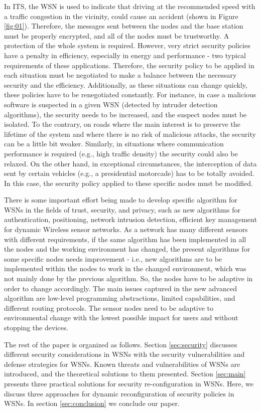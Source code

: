 \documentclass[12pt,a4paper,twoside]{report}
\begin{document}
In ITS, the WSN is used to indicate that driving at the recommended speed with a traffic congestion in the vicinity, could cause an accident (shown in Figure \ref{fig:01}). Therefore, the messages sent between the nodes and the base station must be properly encrypted, and all of the nodes must be trustworthy. A protection of the whole system is required. However, very strict security policies have a penalty in efficiency, especially in energy and performance - two typical requirements of these applications. Therefore, the security policy to be applied in each situation must be negotiated to make a balance between the necessary security and the efficiency. Additionally, as these situations can change quickly, these policies have to be renegotiated constantly. For instance, in case a malicious software is suspected in a given WSN (detected by intruder detection algorithms), the security needs to be increased, and the suspect nodes must be isolated. To the contrary, on roads where the main interest is to preserve the lifetime of the system and where there is no risk of malicious attacks, the security can be a little bit weaker. Similarly, in situations where communication performance is required (e.g., high traffic density) the security could also be relaxed. On the other hand, in exceptional circumstances, the interception of data sent by certain vehicles (e.g., a presidential motorcade) has to be totally avoided. In this case, the security policy applied to these specific nodes must be modified.\par
There is some important effort being made to develop specific algorithm for WSNs in the fields of trust, security, and privacy, such as new algorithms for authentication, positioning, network intrusion detection, efficient key management for dynamic Wireless sensor networks. As a network has many different sensors with different requirements, if the same algorithm has been implemented in all the nodes and the working environment has changed, the present algorithms for some specific nodes needs improvement - i.e., new algorithms are to be implemented within the nodes to work in the changed environment, which was not mainly done by the previous algorithm. So, the nodes have to be adaptive in order to change accordingly. The main issues captured in the new advanced algorithm are low-level programming abstractions, limited capabilities, and different routing protocols. The sensor nodes need to be adaptive to environmental change with the lowest possible impact for users and without stopping the devices.\par
The rest of the paper is organized as follows. Section \ref{sec:security} discusses different security considerations in WSNs with the security vulnerabilities and defense strategies for WSNs. Known threats and vulnerabilities of WSNs are introduced, and the theoretical solutions to them presented. Section \ref{sec:main} presents three practical solutions for security re-configuration in WSNs. Here, we discuss three approaches for dynamic reconfiguration of security policies in WSNs. In section \ref{sec:conclusion} we conclude our paper.  \par
\end{document}
